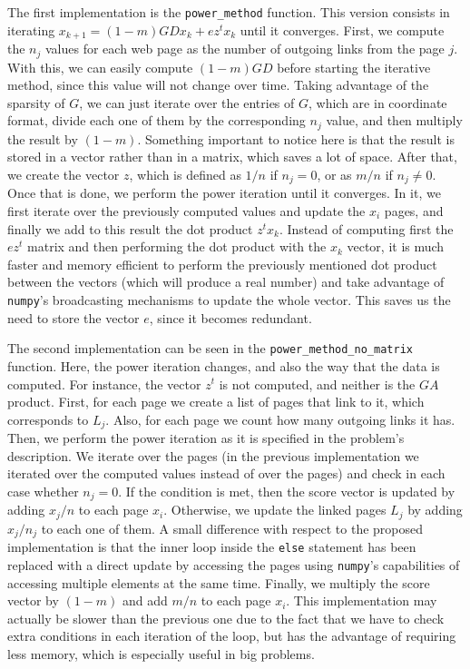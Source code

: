 \documentclass[11pt,a4paper]{article}
\begin{document}
The first implementation is the \texttt{power\_method} function. This version consists in iterating
$x_{k+1} = (1 - m)GDx_k + ez^tx_k$ until it converges. First, we compute the $n_j$ values
for each web page as the number of outgoing links from the page $j$. With this, we can easily compute
$(1 - m)GD$ before starting the iterative method, since this value will not change over time.
Taking advantage of the sparsity of $G$, we can just iterate over the entries of $G$,
which are in coordinate format, divide each one of them by the corresponding $n_j$ value, and then
multiply the result by $(1-m)$. Something important to notice here is that the result is stored
in a vector rather than in a matrix, which saves a lot of space. After that, we create the vector $z$,
which is defined as $1/n$ if $n_j = 0$, or as $m / n$ if $n_j \neq 0$. Once that is done, we perform
the power iteration until it converges. In it, we first iterate over the previously computed values
and update the $x_i$ pages, and finally we add to this result the dot product $z^tx_k$. Instead of
computing first the $ez^t$ matrix and then performing the dot product with the $x_k$ vector, it is
much faster and memory efficient to perform the previously mentioned dot product between the vectors
(which will produce a real number) and take advantage of \texttt{numpy}'s broadcasting mechanisms to
update the whole vector. This saves us the need to store the vector $e$, since it becomes redundant.

The second implementation can be seen in the \texttt{power\_method\_no\_matrix} function. Here,
the power iteration changes, and also the way that the data is computed. For instance, the vector
$z^t$ is not computed, and neither is the $GA$ product. First, for each page we create a list of
pages that link to it, which corresponds to $L_j$. Also, for each page we count how many outgoing
links it has. Then, we perform the power iteration as it is specified in the problem's description.
We iterate over the pages (in the previous implementation we iterated over the computed values instead
of over the pages) and check in each case whether $n_j = 0$. If the condition is met, then the
score vector is updated by adding $x_j / n$ to each page $x_i$. Otherwise, we update
the linked pages $L_j$ by adding $x_j / n_j$ to each one of them. A small difference with respect
to the proposed implementation is that the inner loop inside the \texttt{else} statement has been
replaced with a direct update by accessing the pages using \texttt{numpy}'s capabilities of accessing
multiple elements at the same time. Finally, we multiply the score vector by $(1 - m)$ and add
$m / n$ to each page $x_i$. This implementation may actually be slower than the previous one due to
the fact that we have to check extra conditions in each iteration of the loop, but has the advantage of
requiring less memory, which is especially useful in big problems.
\end{document}
